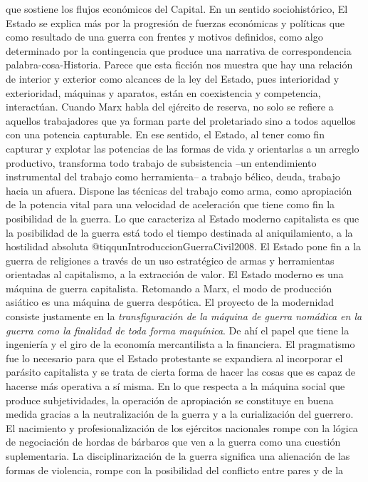 \documentclass[
]{article}
\begin{document}
que sostiene los flujos económicos del Capital. En un sentido
sociohistórico, El Estado se explica más por la progresión de fuerzas
económicas y políticas que como resultado de una guerra con frentes y
motivos definidos, como algo determinado por la contingencia que produce
una narrativa de correspondencia palabra-cosa-Historia. Parece que esta
ficción nos muestra que hay una relación de interior y exterior como
alcances de la ley del Estado, pues interioridad y exterioridad,
máquinas y aparatos, están en coexistencia y competencia, interactúan.
Cuando Marx habla del ejército de reserva, no solo se refiere a aquellos
trabajadores que ya forman parte del proletariado sino a todos aquellos
con una potencia capturable. En ese sentido, el Estado, al tener como
fin capturar y explotar las potencias de las formas de vida y
orientarlas a un arreglo productivo, transforma todo trabajo de
subsistencia --un entendimiento instrumental del trabajo como
herramienta-- a trabajo bélico, deuda, trabajo hacia un afuera. Dispone
las técnicas del trabajo como arma, como apropiación de la potencia
vital para una velocidad de aceleración que tiene como fin la
posibilidad de la guerra. Lo que caracteriza al Estado moderno
capitalista es que la posibilidad de la guerra está todo el tiempo
destinada al aniquilamiento, a la hostilidad absoluta
@tiqqunIntroduccionGuerraCivil2008. El Estado pone fin a la guerra de
religiones a través de un uso estratégico de armas y herramientas
orientadas al capitalismo, a la extracción de valor. El Estado moderno
es una máquina de guerra capitalista. Retomando a Marx, el modo de
producción asiático es una máquina de guerra despótica. El proyecto de
la modernidad consiste justamente en la \emph{transfiguración de la
máquina de guerra nomádica en la guerra como la finalidad de toda forma
maquínica}. De ahí el papel que tiene la ingeniería y el giro de la
economía mercantilista a la financiera. El pragmatismo fue lo necesario
para que el Estado protestante se expandiera al incorporar el parásito
capitalista y se trata de cierta forma de hacer las cosas que es capaz
de hacerse más operativa a sí misma. En lo que respecta a la máquina
social que produce subjetividades, la operación de apropiación se
constituye en buena medida gracias a la neutralización de la guerra y a
la curialización del guerrero. El nacimiento y profesionalización de los
ejércitos nacionales rompe con la lógica de negociación de hordas de
bárbaros que ven a la guerra como una cuestión suplementaria. La
disciplinarización de la guerra significa una alienación de las formas
de violencia, rompe con la posibilidad del conflicto entre pares y de la
\end{document}
